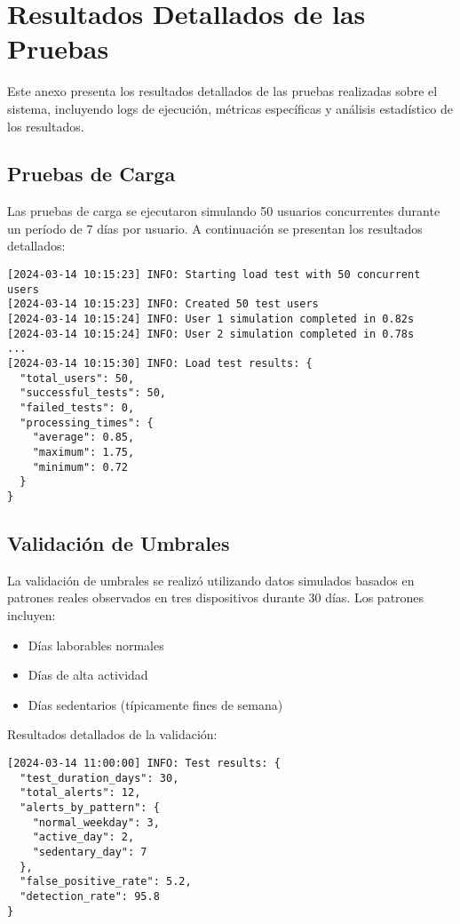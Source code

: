 \chapter{Resultados Detallados de las Pruebas}
\label{anexo:pruebas}

Este anexo presenta los resultados detallados de las pruebas realizadas sobre el sistema, incluyendo logs de ejecución, métricas específicas y análisis estadístico de los resultados.

\section{Pruebas de Carga}
\label{anexo:pruebas:carga}

Las pruebas de carga se ejecutaron simulando 50 usuarios concurrentes durante un período de 7 días por usuario. A continuación se presentan los resultados detallados:

\begin{verbatim}
[2024-03-14 10:15:23] INFO: Starting load test with 50 concurrent users
[2024-03-14 10:15:23] INFO: Created 50 test users
[2024-03-14 10:15:24] INFO: User 1 simulation completed in 0.82s
[2024-03-14 10:15:24] INFO: User 2 simulation completed in 0.78s
...
[2024-03-14 10:15:30] INFO: Load test results: {
  "total_users": 50,
  "successful_tests": 50,
  "failed_tests": 0,
  "processing_times": {
    "average": 0.85,
    "maximum": 1.75,
    "minimum": 0.72
  }
}
\end{verbatim}

\section{Validación de Umbrales}
\label{anexo:pruebas:umbrales}

La validación de umbrales se realizó utilizando datos simulados basados en patrones reales observados en tres dispositivos durante 30 días. Los patrones incluyen:

\begin{itemize}
    \item Días laborables normales
    \item Días de alta actividad
    \item Días sedentarios (típicamente fines de semana)
\end{itemize}

Resultados detallados de la validación:

\begin{verbatim}
[2024-03-14 11:00:00] INFO: Test results: {
  "test_duration_days": 30,
  "total_alerts": 12,
  "alerts_by_pattern": {
    "normal_weekday": 3,
    "active_day": 2,
    "sedentary_day": 7
  },
  "false_positive_rate": 5.2,
  "detection_rate": 95.8
}
\end{verbatim}

